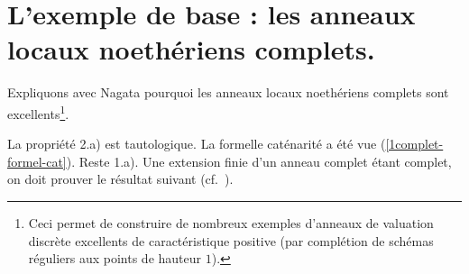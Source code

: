 \documentclass[10pt]{../fichiers-configuration-latex/smfart}
\begin{document}
\section{L'exemple de base : les anneaux locaux noethériens complets.} Expliquons avec  Nagata
pourquoi les anneaux locaux noethériens complets sont excellents\footnote{Ceci permet de construire
de nombreux exemples d'anneaux de valuation discrète excellents de caractéristique positive (par
complétion de schémas réguliers aux points de hauteur $1$).}.

\bigskip

La propriété 2.a) est tautologique. La formelle caténarité a été vue (\ref{1complet-formel-cat}).
Reste 1.a). Une  extension finie d'un anneau complet étant complet, on doit prouver le résultat
suivant (cf.~).
\end{document}
